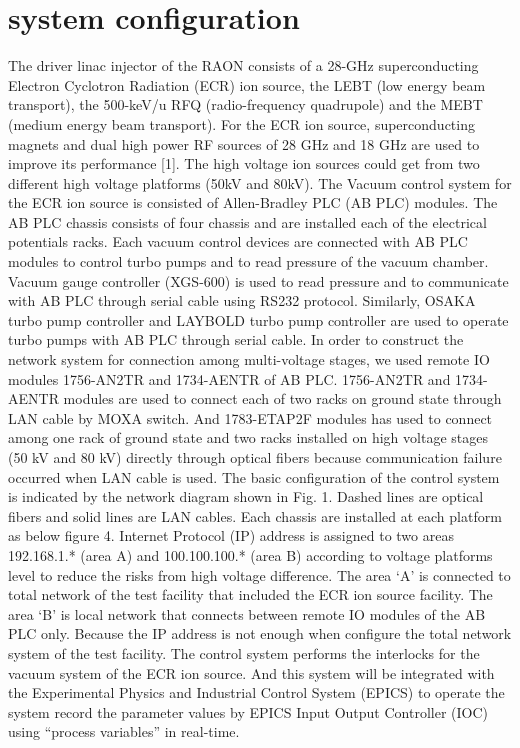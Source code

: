 \documentclass[a4paper,
              ]{jacow}
\begin{document}
\section{system configuration}
The driver linac injector of the RAON consists of a 28-GHz superconducting Electron Cyclotron Radiation (ECR) ion source, the LEBT (low energy beam transport), the 500-keV/u RFQ (radio-frequency quadrupole) and the MEBT (medium energy beam transport). For the ECR ion source, superconducting magnets and dual high power RF sources of 28 GHz and 18 GHz are used to improve its performance [1]. The high voltage ion sources could get from two different high voltage platforms (50kV and 80kV).
The Vacuum control system for the ECR ion source is consisted of Allen-Bradley PLC (AB PLC) modules. The AB PLC chassis consists of four chassis and are installed each of the electrical potentials racks. Each vacuum control devices are connected with AB PLC modules to control turbo pumps and to read pressure of the vacuum chamber. Vacuum gauge controller (XGS-600) is used to read pressure and to communicate with AB PLC through serial cable using RS232 protocol. Similarly, OSAKA turbo pump controller and LAYBOLD turbo pump controller are used to operate turbo pumps with AB PLC through serial cable.
In order to construct the network system for connection among multi-voltage stages, we used remote IO modules 1756-AN2TR and 1734-AENTR of AB PLC. 1756-AN2TR and 1734-AENTR modules are used to connect each of two racks on ground state through LAN cable by MOXA switch. And 1783-ETAP2F modules has used to connect among one rack of ground state and two racks installed on high voltage stages (50 kV and 80 kV) directly through optical fibers because communication failure occurred when LAN cable is used. The basic configuration of the control system is indicated by the network diagram shown in Fig. 1. Dashed lines are optical fibers and solid lines are LAN cables. Each chassis are installed at each platform as below figure 4.
Internet Protocol (IP) address is assigned to two areas 192.168.1.* (area A) and 100.100.100.* (area B) according to voltage platforms level to reduce the risks from high voltage difference. The area ‘A’ is connected to total network of the test facility that included the ECR ion source facility. The area ‘B’ is local network that connects between remote IO modules of the AB PLC only. Because the IP address is not enough when configure the total network system of the test facility.
The control system performs the interlocks for the vacuum system of the ECR ion source. And this system will be integrated with the Experimental Physics and Industrial Control System (EPICS) to operate the system record the parameter values by EPICS Input Output Controller (IOC) using “process variables” in real-time.
\end{document}
